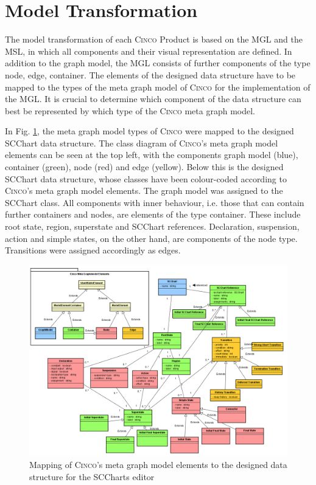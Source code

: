 \section{Model Transformation}
The model transformation of each \textsc{Cinco} Product is based on the MGL and the MSL, in which all components and their visual representation are defined. In addition to the graph model, the MGL consists of further components of the type node, edge, container. The elements of the designed data structure have to be mapped to the types of the meta graph model of \textsc{Cinco} for the implementation of the MGL. It is crucial to determine which component of the data structure can best be represented by which type of the \textsc{Cinco} meta graph model. 

In Fig. \ref{fig:MappingModelTransformation}, the meta graph model types of \textsc{Cinco} were mapped to the designed SCChart data structure. The class diagram of \textsc{Cinco}'s meta graph model elements can be seen at the top left, with the components graph model (blue), container (green), node (red) and edge (yellow). Below this is the designed SCChart data structure, whose classes have been colour-coded according to \textsc{Cinco}'s meta graph model elements. The graph model was assigned to the SCChart class. All components with inner behaviour, i.e. those that can contain further containers and nodes, are elements of the type container. These include root state, region, superstate and SCChart references. Declaration, suspension, action and simple states, on the other hand, are components of the node type. Transitions were assigned accordingly as edges.

\begin{figure}[h!]
\centering
\includegraphics[width=1.0\textwidth]{bilder/MappingModelTransformation.png}
\caption{Mapping of \textsc{Cinco}'s meta graph model elements to the designed data structure for the SCCharts editor}
\label{fig:MappingModelTransformation}
\end{figure} 

